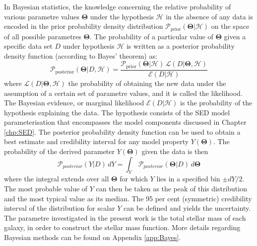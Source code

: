 In Bayesian statistics, the knowledge concerning the relative probability of various parametre values $\mathbf{\Theta}$ under the hypothesis $\mathcal{H}$ in the absence of any data is encoded in the prior probability density distribution $\mathscr{P}_{\mbox{prior}}(\mathbf{\Theta}| \mathcal{H})$ on the space of all possible parametres $\mathbf{\Theta}$. 
The probability of a particular value of $\mathbf{\Theta}$ given a specific data set $D$ under hypothesis $\mathcal{H}$ is written as a posterior probability density function (according to Bayes’ theorem) as: 
\begin{equation}
    \mathscr{P}_{\mbox{posterior}}(\mathbf{\Theta}|D, \mathcal{H}) = \dfrac{\mathscr{P}_{\mbox{prior}}(\mathbf{\Theta}|\mathcal{H})\,\mathscr{L}(D|\mathbf{\Theta}, \mathcal{H})}{\mathscr{E}(D|\mathcal{H}) } \label{eq:Bayes}
\end{equation}
where $\mathscr{L}(D|\mathbf{\Theta}, \mathcal{H} )$ the probability of obtaining the new data under the assumption of a certain set of parametre values, and it is called the likelihood. The Bayesian evidence, or marginal likelihood $\mathscr{E}(D| \mathcal{H})$ is the probability of the hypothesis explaining the data. The hypothesis consists of the SED model parameterisation that encompasses the model components discussed in Chapter \ref{chp:SED}.
The posterior probability density function can be used to obtain a best estimate and credibility interval for any model property $Y(\mathbf{\Theta})$.
The probability of the derived parameter $Y(\mathbf{\Theta})$ given the data is then
\begin{equation}
    \mathscr{P}_{posterior}(Y|D) \,dY = \int_Y \, \mathscr{P}_{posterior}(\mathbf{\Theta}|D) \,d\mathbf{\Theta} 
\end{equation}
where the integral extends over all $\mathbf\Theta$ for which $Y$ lies in a specified bin $\pm dY/2$. The most probable value of $Y$ can then be taken as the peak of this distribution and the most typical value as its median. The 95 per cent (symmetric) credibility interval of the distribution for scalar $Y$ can be defined and yields the uncertainty. The parametre investigated in the present work is the total stellar mass of each galaxy, in order to construct the stellar mass function.
More details regarding Bayesian methods can be found on Appendix \ref{app:Bayes}.


